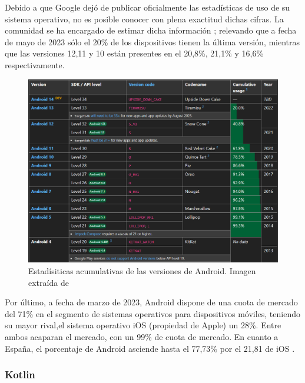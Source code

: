             Debido a que Google dejó de publicar oficialmente las estadísticas de uso de su sistema operativo, no es
            posible conocer con plena exactitud dichas cifras. La comunidad se ha encargado de estimar dicha 
            información \cite{belinski_android_nodate}; relevando que a fecha de mayo de 2023 sólo el 20\% de los 
            dispositivos tienen la última versión, mientras que las versiones 12,11 y 10 están presentes en el 
            20,8\%, 21,1\% y 16,6\% respectivamente. \newline

            \begin{figure}[H]
                \centering
                \includegraphics[width=1\textwidth]{figures/Android usage.PNG}
                \caption[Estadísiticas acumulativas de las versiones de Android]
                {Estadísiticas acumulativas de las versiones de Android. Imagen extraída de \cite{belinski_android_nodate}}
                \label{figure:android:usage}
            \end{figure}

            Por último, a fecha de marzo de 2023, Android dispone de una cuota de mercado del 71\% en el segmento de sistemas 
            operativos para dispositivos móviles, teniendo su mayor rival,el sistema operativo iOS (propiedad de Apple) 
            un 28\%. Entre ambos acaparan el mercado, con un 99\% de cuota de mercado. En cuanto a España, el 
            porcentaje de Android asciende hasta el 77,73\% por el 21,81 de iOS \cite{press_asi_2023}.

        \subsubsection{Kotlin}

